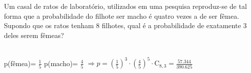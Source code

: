\begin{ex}
Um casal de ratos de laboratório, utilizados em uma pesquisa reproduz-se de tal forma que a probabilidade do filhote ser macho é quatro vezes a de ser fêmea. Supondo que os ratos tenham 8 filhotes, qual é a probabilidade de exatamente 3 deles serem fêmeas?
  \begin{sol}
    \phantom{A} \\
    p(fêmea)= $\frac{1}{5}$\hspace{0,4cm}  p(macho)= $\frac{4}{5}$ 
    $\Longrightarrow p=(\frac{1}{5})^3\cdot(\frac{4}{5})^5\cdot\mathrm{C}_{8,3}=\frac{57.344}{390.625}$
  \end{sol}
\end{ex}